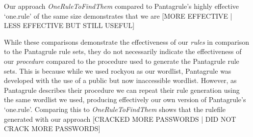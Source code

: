 \documentclass[letterpaper,twocolumn,10pt]{article}
\begin{document}
Our approach \textit{OneRuleToFindThem} compared to Pantagrule's highly
effective `one.rule' of
the same size demonstrates that we are [MORE EFFECTIVE | LESS EFFECTIVE BUT STILL USEFUL]

While these comparisons demonstrate the effectiveness of our \textit{rules} in
comparison to the Pantagrule rule sets, they do not necessarily indicate the
effectiveness of our \textit{procedure} compared to the procedure used to
generate the Pantagrule rule sets. This is because while we used rockyou as our
wordlist, Pantagrule was developed with the use of a public but now
inaccessible wordlist. However, as Pantagrule describes their procedure we can
repeat their rule generation using the same wordlist we used, producing
effectively our own version of Pantagrule's `one.rule'. Comparing this to
\textit{OneRuleToFindThem} shows that the rulefile generated with our approach
[CRACKED MORE PASSWORDS | DID NOT CRACK MORE PASSWORDS]

\end{document}
